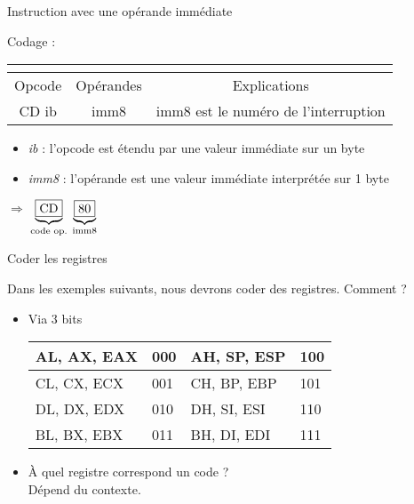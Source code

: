 \documentclass[14pt,xcolor,table]{beamer}
\begin{document}
\begin{frame}[fragile]{Instruction avec une opérande immédiate}

	Codage : {\small\emph{ }}
	
	
	\begin{center}
	\begin{footnotesize}
	\begin{tabular}{|c|c|c|}
		\multicolumn{3}{c}{\asm{INT}}\\\hline
		{\cellcolor{gray!25}Opcode} & {\cellcolor{gray!25}Opérandes} & {\cellcolor{gray!25}Explications} \\\hline
		CD ib & imm8 & imm8 est le numéro de l'interruption \\\hline
	\end{tabular}
	\end{footnotesize}
	\end{center}
	
	\begin{itemize}
	\item \emph{ib} : l'opcode est étendu par une valeur immédiate sur un byte
	\item \emph{imm8} : l'opérande est une valeur immédiate interprétée sur 1 byte
	\end{itemize}	
	
	\begin{center}
			$\Longrightarrow$ 
			$\underbrace{\fbox{CD}}_{\text{code op.}}$
			$\underbrace{\fbox{80}}_{\text{imm8}}$
	\end{center}
		
\end{frame}

\begin{frame}[fragile]{Coder les registres}

	Dans les exemples suivants, nous devrons coder des registres.
	Comment ?
	\begin{itemize}
	\item Via 3 bits
	
		\begin{center}
		\begin{tabular}{|l|l||l|l|}
		\hline 
		AL, AX, EAX & 000 & AH, SP, ESP & 100\tabularnewline
		\hline 
		CL, CX, ECX & 001 & CH, BP, EBP & 101\tabularnewline
		\hline 
		DL, DX, EDX & 010 & DH, SI, ESI & 110\tabularnewline
		\hline 
		BL, BX, EBX & 011 & BH, DI, EDI & 111\tabularnewline
		\hline 
		\end{tabular}
		\end{center}
		
	\item 
		À quel registre correspond un code ?
		\\Dépend du contexte.
	\end{itemize}

\end{frame}
\end{document}
